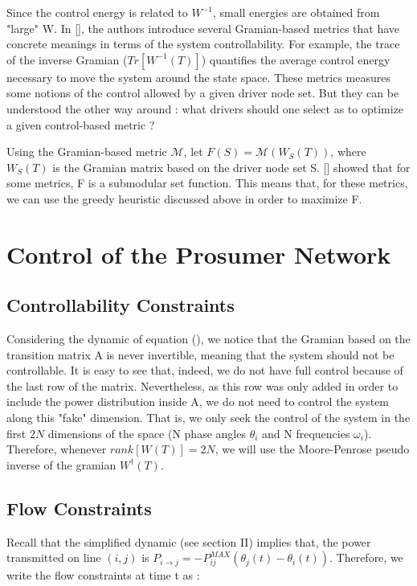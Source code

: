 \documentclass[conference]{IEEEtran}
\begin{document}
Since the control energy is related to $ W^{-1} $, small energies are obtained from "large" W. In [], the authors introduce several Gramian-based metrics that have concrete meanings in terms of the system controllability. For example, the trace of the inverse Gramian ($ Tr[ W^{-1}(T)] $) quantifies the average control energy necessary to move the system around the state space. These metrics measures some notions of the control allowed by a given driver node set. But they can be understood the other way around : what drivers should one select as to optimize a given control-based metric ? 

Using the Gramian-based metric $ \mathcal{M} $, let $ F(S) =\mathcal{M}(W_S(T))$, where $ W_S(T) $  is the Gramian matrix based on the driver node set S. [] showed that for some metrics, F is a submodular set function. This means that, for these metrics, we can use the greedy heuristic discussed above in order to maximize F.



\section{Control of the Prosumer Network}
\label{sec:Control_prosumer}

\subsection{Controllability Constraints}

 Considering the dynamic of equation (), we notice that the Gramian based on the transition matrix A is never invertible, meaning that the system should not be controllable. It is easy to see that, indeed, we do not have full control because of the last row of the matrix. Nevertheless, as this row was only added in order to include the power distribution inside A, we do not need to control the system along this "fake" dimension. That is, we only seek the control of the system in the first $ 2N $ dimensions of the space (N phase angles $ \theta_i$ and N frequencies $\omega_i$). Therefore, whenever $ rank[ W(T) ] = 2N$, we will use the Moore-Penrose pseudo inverse of the gramian $ W^\dagger(T) $.


\subsection{Flow Constraints}

Recall that the simplified dynamic (see section II) implies that, the power transmitted on line $ (i,j)$ is $ P_{i \longrightarrow j} = -P_{ij}^{MAX} \left( \theta_j(t) - \theta_i(t) \right) $. Therefore, we write the flow constraints at time t as :
\end{document}
